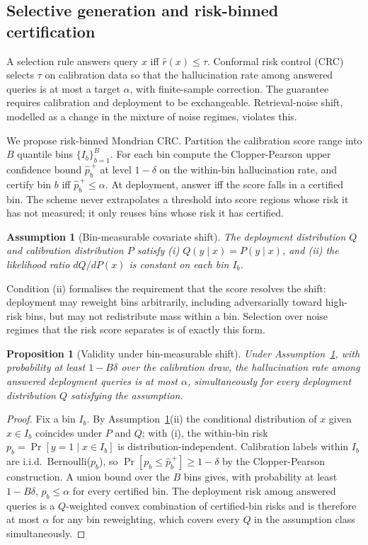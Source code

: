 \documentclass[11pt]{article}
\newtheorem{proposition}{Proposition}
\newtheorem{assumption}{Assumption}
\begin{document}
\subsection{Selective generation and risk-binned certification}
\label{sec:methodconformal}
A selection rule answers query $x$ iff $\hat r(x) \le \tau$. Conformal
risk control (CRC) selects $\tau$ on calibration data so that the
hallucination rate among answered queries is at most a target $\alpha$,
with finite-sample correction. The guarantee requires calibration and
deployment to be exchangeable. Retrieval-noise shift, modelled as a
change in the mixture of noise regimes, violates this.

We propose risk-binned Mondrian CRC. Partition the calibration score
range into $B$ quantile bins $\{I_b\}_{b=1}^{B}$. For each bin compute
the Clopper-Pearson upper confidence bound $\widehat p^{\,+}_b$ at
level $1 - \delta$ on the within-bin hallucination rate, and certify
bin $b$ iff $\widehat p^{\,+}_b \le \alpha$. At deployment, answer iff
the score falls in a certified bin. The scheme never extrapolates a
threshold into score regions whose risk it has not measured; it only
reuses bins whose risk it has certified.

\begin{assumption}[Bin-measurable covariate shift]\label{ass:shift}
The deployment distribution $Q$ and calibration distribution $P$
satisfy (i) $Q(y \mid x) = P(y \mid x)$, and (ii) the likelihood ratio
$dQ/dP(x)$ is constant on each bin $I_b$.
\end{assumption}

Condition (ii) formalises the requirement that the score resolves the
shift: deployment may reweight bins arbitrarily, including
adversarially toward high-risk bins, but may not redistribute mass
within a bin. Selection over noise regimes that the risk score
separates is of exactly this form.

\begin{proposition}[Validity under bin-measurable shift]
\label{prop:riskbin}
Under Assumption~\ref{ass:shift}, with probability at least
$1 - B\delta$ over the calibration draw, the hallucination rate among
answered deployment queries is at most $\alpha$, simultaneously for
every deployment distribution $Q$ satisfying the assumption.
\end{proposition}

\begin{proof}
Fix a bin $I_b$. By Assumption~\ref{ass:shift}(ii) the conditional
distribution of $x$ given $x \in I_b$ coincides under $P$ and $Q$;
with (i), the within-bin risk $p_b = \Pr[y = 1 \mid x \in I_b]$ is
distribution-independent. Calibration labels within $I_b$ are i.i.d.\
Bernoulli($p_b$), so $\Pr[p_b \le \widehat p^{\,+}_b] \ge 1 - \delta$
by the Clopper-Pearson construction. A union bound over the $B$ bins
gives, with probability at least $1 - B\delta$, $p_b \le \alpha$ for
every certified bin. The deployment risk among answered queries is a
$Q$-weighted convex combination of certified-bin risks and is therefore
at most $\alpha$ for any bin reweighting, which covers every $Q$ in the
assumption class simultaneously.
\end{proof}
\end{document}
